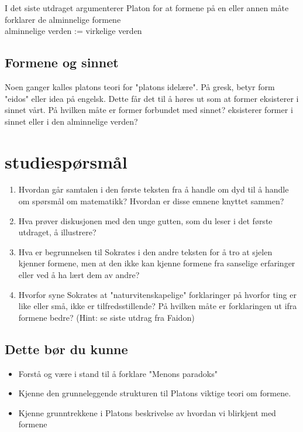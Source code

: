 \documentclass[11pt, a4paper]{article}
\begin{document}
I det siste utdraget argumenterer Platon for at formene på en eller annen måte forklarer de alminnelige formene\\

alminnelige verden := virkelige verden



\subsection{Formene og sinnet}

Noen ganger kalles platons teori for "platons idelære". På gresk, betyr form "eidos" eller idea på engelsk. Dette får det til å høres ut som at former eksisterer i sinnet vårt. På hvilken måte er former forbundet med sinnet? eksisterer former i sinnet eller i den alminnelige verden?


\section{studiespørsmål}

\begin{enumerate}
    \item Hvordan går samtalen i den første teksten fra å handle om dyd til å handle om spørsmål om matematikk? Hvordan er disse emnene knyttet sammen?
    \item Hva prøver diskusjonen med den unge gutten, som du leser i det første utdraget, å illustrere?
    \item Hva er begrunnelsen til Sokrates i den andre teksten for å tro at sjelen kjenner formene, men at den ikke kan kjenne formene fra sanselige erfaringer eller ved å ha lært dem av andre?
    \item Hvorfor syne Sokrates at "naturvitenskapelige" forklaringer på hvorfor ting er like eller små, ikke er tilfredsstillende? På hvilken måte er forklaringen ut ifra formene bedre? (Hint: se siste utdrag fra Faidon)
\end{enumerate}

\subsection{Dette bør du kunne}

\begin{itemize}
    \item Forstå og være i stand til å forklare "Menons paradoks"
    \item Kjenne den grunneleggende strukturen til Platons viktige teori om formene.
    \item Kjenne grunntrekkene i Platons beskrivelse av hvordan vi blirkjent med formene
\end{itemize}
\end{document}
